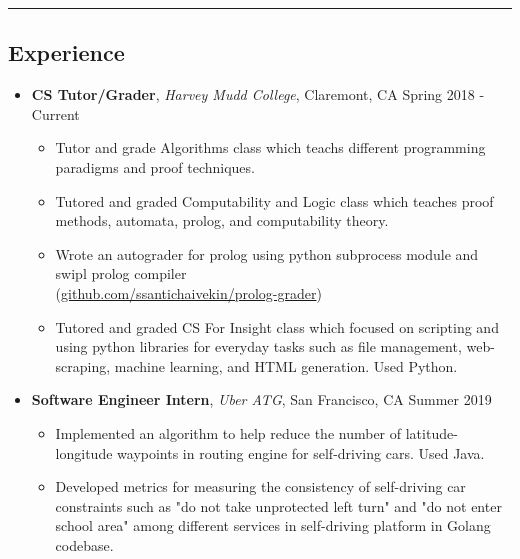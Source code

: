 \documentclass[10.5pt,letterpaper]{article}
\begin{document}
\hrule
\vspace{-0.95em}
\subsection*{Experience}
  \begin{itemize}
    \parskip=-0.45em
    \item[]
    {\textbf{CS Tutor/Grader}, \textit{Harvey Mudd College}, Claremont, CA \hfill {Spring 2018 - Current}}
    \begin{itemize}[label=\textbullet]
      \itemsep0.1em
      \item Tutor and grade Algorithms class which teachs different programming paradigms and proof techniques.
      \item Tutored and graded Computability and Logic class which teaches proof methods, automata, prolog,
      and computability theory. 
      \item Wrote an autograder for prolog using python subprocess module and swipl prolog compiler \\
      (\href{https://github.com/ssantichaivekin/prolog-grader}{github.com/ssantichaivekin/prolog-grader})
      \item Tutored and graded CS For Insight class which focused 
      on scripting and using python libraries for everyday tasks such as file management, web-scraping, 
      machine learning, and HTML generation. Used Python.
    \end{itemize}
    \vspace{0.1em}
    \item[]
    {\textbf{Software Engineer Intern}, \textit{Uber ATG}, San Francisco, CA \hfill {Summer 2019}}
    \begin{itemize}[label=\textbullet]
      \itemsep0.1em
      \item Implemented an algorithm to help reduce the number of
      latitude-longitude waypoints in routing engine for self-driving cars. Used Java.
      \item Developed metrics for measuring the consistency of self-driving car constraints such as
      "do not take unprotected left turn" and "do not enter school area" among different services in 
      self-driving platform in Golang codebase.
    \end{itemize}
    \vspace{0.1em}

\end{itemize}
\end{document}
